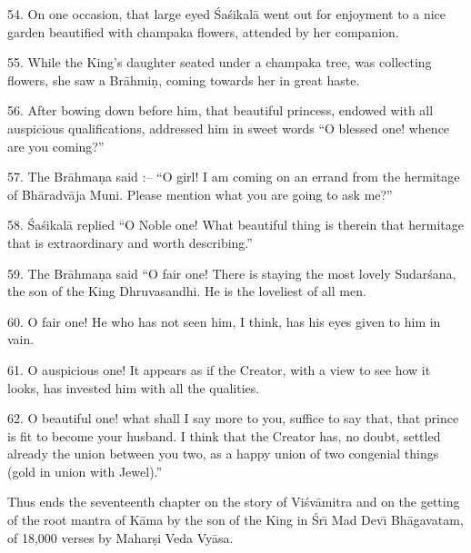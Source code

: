 54. On one occasion, that large eyed \'Sa\'sikal\=a went out for enjoyment to a nice garden beautified with champaka flowers, attended by her companion.

55. While the King's daughter seated under a champaka tree, was collecting flowers, she saw a Br\=ahmi\d{n}, coming towards her in great haste.

56. After bowing down before him, that beautiful princess, endowed with all auspicious qualifications, addressed him in sweet words ``O blessed one! whence are you coming?''

57. The Br\=ahma\d{n}a said :-- ``O girl! I am coming on an errand from the hermitage of Bh\=aradv\=aja Muni. Please mention what you are going to ask me?''

58. \'Sa\'sikal\=a replied ``O Noble one! What beautiful thing is therein that hermitage that is extraordinary and worth describing.''

59. The Br\=ahma\d{n}a said ``O fair one! There is staying the most lovely Sudar\'sana, the son of the King Dhruvasandhi. He is the loveliest of all men.

60. O fair one! He who has not seen him, I think, has his eyes given to him in vain.

61. O auspicious one! It appears as if the Creator, with a view to see how it looks, has invested him with all the qualities.

62. O beautiful one! what shall I say more to you, suffice to say that, that prince is fit to become your husband. I think that the Creator has, no doubt, settled already the union between you two, as a happy union of two congenial things (gold in union with Jewel).''

Thus ends the seventeenth chapter on the story of Vi\'sv\=amitra and on the getting of the root mantra of K\=ama by the son of the King in \'Sr\={\i} Mad Dev\={\i} Bh\=agavatam, of 18,000 verses by Mahar\d{s}i Veda Vy\=asa.



